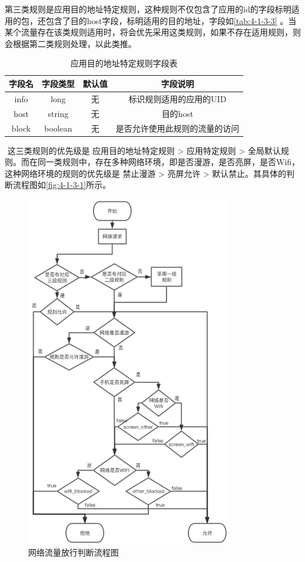 \documentclass[format=final, language=chinese, degree=fyp]{hustthesis}
\begin{document}
第三类规则是应用目的地址特定规则，这种规则不仅包含了应用的id的字段标明适用的包，还包含了目的host字段，标明适用的目的地址，字段如\autoref{tab:4-1-3-3} 。当某个流量存在该类规则适用时，将会优先采用这类规则，如果不存在适用规则，则会根据第二类规则处理，以此类推。

\begin{table}[h!]
	\centering
	\caption{应用目的地址特定规则字段表}\label{tab:4-1-3-3}
	\begin{tabular}{|c|c|c|c|}
		\hline
		字段名			&	字段类型		&	默认值	&	字段说明 \\\hline
		info			&	long 		&	无		&	标识规则适用的应用的UID\\\hline
		host			& 	string 		& 	无		&	目的host\\\hline
		block			&	boolean		&	无		& 	是否允许使用此规则的流量的访问\\\hline
	\end{tabular}
\end{table}
 这三类规则的优先级是 应用目的地址特定规则 > 应用特定规则 > 全局默认规则。而在同一类规则中，存在多种网络环境，即是否漫游，是否亮屏，是否Wifi，这种网络环境的规则的优先级是 禁止漫游 > 亮屏允许 > 默认禁止。其具体的判断流程图如\autoref{fig:4-1-3-1}所示。

	\begin{figure}[h]
		\centering
		\includegraphics[width=0.8\textwidth]{process_4_1_rule.png}
		\caption{网络流量放行判断流程图}\label{fig:4-1-3-1}
	\end{figure}
 
	\FloatBarrier
\end{document}
